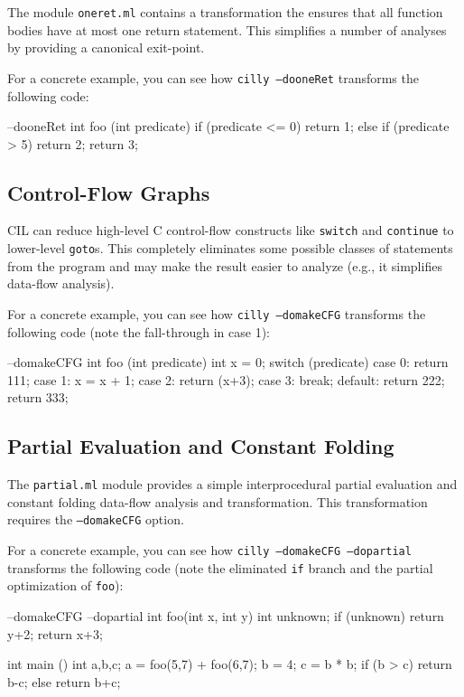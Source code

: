 \documentclass{article}
\def\t#1{{\tt #1}}
\begin{document}
The module \t{oneret.ml} contains a transformation the ensures that all
function bodies have at most one return statement. This simplifies a number
of analyses by providing a canonical exit-point. 

For a concrete example, you can see how \t{cilly --dooneRet}
transforms the following code: 

\begin{cilcode}[global] --dooneRet
  int foo (int predicate) {
    if (predicate <= 0) {
      return 1;
    } else {
      if (predicate > 5)
        return 2;
      return 3;
    }
  }
\end{cilcode}

\subsection{Control-Flow Graphs}

CIL can reduce high-level C control-flow constructs like \t{switch} and
\t{continue} to lower-level \t{goto}s. This completely eliminates some
possible classes of statements from the program and may make the result
easier to analyze (e.g., it simplifies data-flow analysis). 

For a concrete example, you can see how \t{cilly --domakeCFG}
transforms the following code (note the fall-through in case 1): 

\begin{cilcode}[global] --domakeCFG
  int foo (int predicate) {
    int x = 0;
    switch (predicate) {
      case 0: return 111;
      case 1: x = x + 1;
      case 2: return (x+3);
      case 3: break;
      default: return 222;
    }
    return 333;
  }
\end{cilcode}

\subsection{Partial Evaluation and Constant Folding} 

The \t{partial.ml} module provides a simple interprocedural partial
evaluation and constant folding data-flow analysis and transformation. This
transformation requires the \t{--domakeCFG} option. 

For a concrete example, you can see how \t{cilly --domakeCFG --dopartial}
transforms the following code (note the eliminated \t{if} branch and the
partial optimization of \t{foo}): 

\begin{cilcode}[global] --domakeCFG --dopartial
  int foo(int x, int y) {
    int unknown;
    if (unknown)
      return y+2;     
    return x+3;      
  }

  int main () {
    int a,b,c;
    a = foo(5,7) + foo(6,7);
    b = 4;
    c = b * b;      
    if (b > c)     
      return b-c;
    else
      return b+c; 
  }
\end{cilcode}
\end{document}

